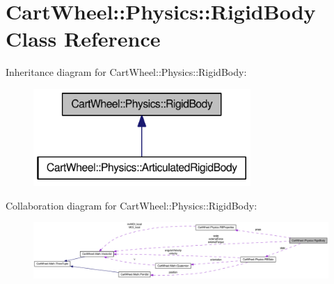 \hypertarget{classCartWheel_1_1Physics_1_1RigidBody}{
\section{CartWheel::Physics::RigidBody Class Reference}
\label{classCartWheel_1_1Physics_1_1RigidBody}
}


Inheritance diagram for CartWheel::Physics::RigidBody:\nopagebreak
\begin{figure}[H]
\begin{center}
\leavevmode
\includegraphics[width=234pt]{classCartWheel_1_1Physics_1_1RigidBody__inherit__graph}
\end{center}
\end{figure}


Collaboration diagram for CartWheel::Physics::RigidBody:\nopagebreak
\begin{figure}[H]
\begin{center}
\leavevmode
\includegraphics[width=400pt]{classCartWheel_1_1Physics_1_1RigidBody__coll__graph}
\end{center}
\end{figure}
